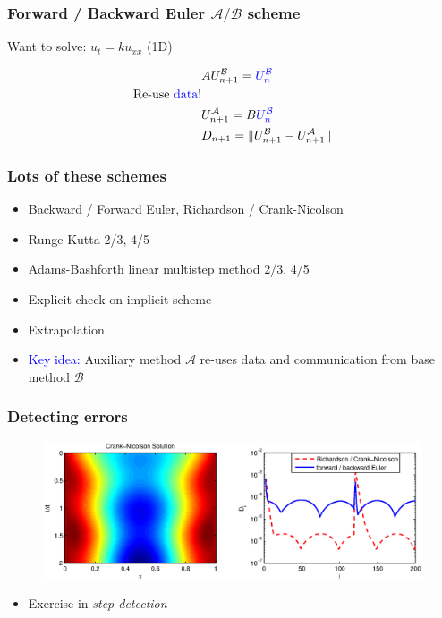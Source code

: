 \documentclass{beamer}
\newcommand{\A}{\mathcal{A}}
\newcommand{\B}{\mathcal{B}}
\begin{document}
\begin{frame}
\frametitle{Forward / Backward Euler $\A/\B$ scheme}
Want to solve: $u_t = ku_{xx}$ (1D)

\begin{align}
& AU^{\B}_{n+1} = \textcolor{blue}{U^{\B}_{n}} \nonumber \\
\text{Re-use \textcolor{blue}{data}!} \nonumber \\
& U^{\A}_{n+1} = B\textcolor{blue}{U^{\B}_{n}} \nonumber \\
& D_{n+1} = \| U^{\B}_{n+1} - U^{\A}_{n+1} \| \nonumber
\end{align}



\end{frame}



%
\begin{frame}
\frametitle{Lots of these schemes}

\begin{itemize}
\item Backward / Forward Euler, Richardson / Crank-Nicolson
\item Runge-Kutta 2/3, 4/5
\item Adams-Bashforth linear multistep method 2/3, 4/5
\item Explicit check on implicit scheme
\item Extrapolation
\end{itemize}

\pause
\begin{itemize}
\item \textcolor{blue}{Key idea:}  Auxiliary method $\A$ re-uses data and communication from base method $\B$
\end{itemize}

\end{frame}

%
\begin{frame}
\frametitle{Detecting errors}

\begin{figure}
  \centering
  \includegraphics[scale=0.5]{figs/heat_soln_diffs1.eps}
\end{figure}

\begin{itemize}
\item Exercise in \emph{step detection}
\end{itemize}

\end{frame}
\end{document}

